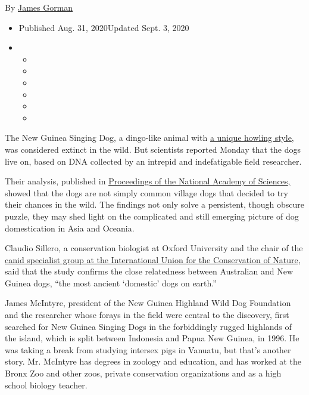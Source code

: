By \href{https://www.nytimes3xbfgragh.onion/by/james-gorman}{James
Gorman}

\begin{itemize}
\item
  Published Aug. 31, 2020Updated Sept. 3, 2020
\item
  \begin{itemize}
  \item
  \item
  \item
  \item
  \item
  \item
  \end{itemize}
\end{itemize}

The New Guinea Singing Dog, a dingo-like animal with
\href{https://www.facebookcorewwwi.onion/704579679701546/videos/707737052719142}{a
unique howling style}, was considered extinct in the wild. But
scientists reported Monday that the dogs live on, based on DNA collected
by an intrepid and indefatigable field researcher.

Their analysis, published in
\href{https://www.pnas.org/cgi/doi/10.1073/pnas.2007242117}{Proceedings
of the National Academy of
Sciences}\href{https://www.pnas.org/content/early/2020/08/26/2007242117}{,}
showed that the dogs are not simply common village dogs that decided to
try their chances in the wild. The findings not only solve a persistent,
though obscure puzzle, they may shed light on the complicated and still
emerging picture of dog domestication in Asia and Oceania.

Claudio Sillero, a conservation biologist at Oxford University and the
chair of the \href{https://www.canids.org/}{canid specialist group at
the International Union for the Conservation of Nature}, said that the
study confirms the close relatedness between Australian and New Guinea
dogs, ``the most ancient `domestic' dogs on earth.''

James McIntyre, president of the New Guinea Highland Wild Dog Foundation
and the researcher whose forays in the field were central to the
discovery, first searched for New Guinea Singing Dogs in the
forbiddingly rugged highlands of the island, which is split between
Indonesia and Papua New Guinea, in 1996. He was taking a break from
studying intersex pigs in Vanuatu, but that's another story. Mr.
McIntyre has degrees in zoology and education, and has worked at the
Bronx Zoo and other zoos, private conservation organizations and as a
high school biology teacher.

